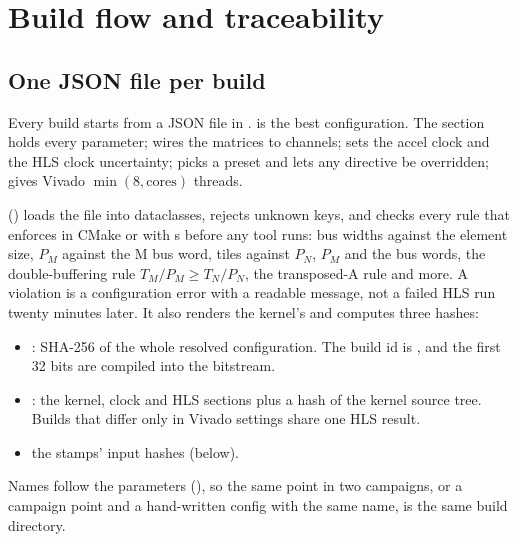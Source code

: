 \section{Build flow and traceability}
\label{sec:flow}

\subsection{One JSON file per build}
Every build starts from a JSON file in .  is the best configuration. The
 section holds every  parameter;  wires the matrices to channels;
 sets the accel clock and the HLS clock uncertainty;  picks a preset and lets any directive
be overridden;  gives Vivado \(\min(8, \text{cores})\) threads.



 () loads the file into dataclasses, rejects unknown keys, and checks
every rule that  enforces in CMake or with s before any tool runs: bus widths
against the element size, \(P_M\) against the M bus word, tiles against \(P_N\), \(P_M\) and the bus words, the
double-buffering rule \(T_M/P_M \ge T_N/P_N\), the transposed-A rule and more. A violation is a configuration error
with a readable message, not a failed HLS run twenty minutes later. It also renders the kernel's  and
computes three hashes:
\begin{itemize}
  \item {}: SHA-256 of the whole resolved configuration. The build id is
        , and the first 32 bits are compiled into the bitstream.
  \item {}: the kernel, clock and HLS sections plus a hash of the kernel source tree. Builds that differ
        only in Vivado settings share one HLS result.
  \item the stamps' input hashes (below).
\end{itemize}
Names follow the parameters (), so the same point in two
campaigns, or a campaign point and a hand-written config with the same name, is the same build directory.

